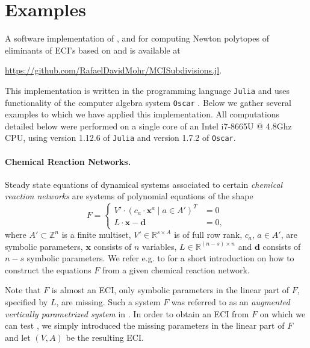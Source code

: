 \documentclass[a4paper]{article}
\theoremstyle{remark}
\def\RR{\mathbb{R}}
\def\ZZ{\mathbb{Z}}
\def\xx{\mathbf{x}}
\begin{document}
\section{Examples}
\label{sec:examples}

A software implementation of ,  and for
computing Newton polytopes of eliminants of ECI's based on
 and \cite{hugginsIB4eSoftwareFramework2006} is
available at
\begin{center}
  \url{https://github.com/RafaelDavidMohr/MCISubdivisions.jl}.
\end{center}
This implementation is written in the programming language
\texttt{Julia} \cite{bezanson2017} and uses functionality of the
computer algebra system \texttt{Oscar} \cite{OSCAR-book}. Below we
gather several examples to which we have applied this implementation.
All computations detailed below were performed on a single core of an
Intel i7-8665U @ 4.8Ghz CPU, using version 1.12.6 of \texttt{Julia}
and version 1.7.2 of \texttt{Oscar}.

\paragraph*{Chemical Reaction Networks.}

Steady state equations of dynamical systems associated to certain {\em
  chemical reaction networks} are systems of polynomial
equations of the shape
\[F =
  \begin{cases}
    V' \cdot (c_a \cdot \xx^a\;|\; a\in A')^T &= 0\\
    L \cdot \xx - \mathbf{d} &=0,
  \end{cases}
\]
where $A'\subset \ZZ^n$ is a finite multiset, $V'\in \RR^{s \times A}$ is of full row
rank, $c_a$, $a\in A'$, are symbolic parameters, $\xx$ consists of $n$
variables, $L\in \RR^{(n - s) \times n}$ and $\mathbf{d}$ consists of
$n-s$ symbolic parameters. We refer e.g. to
\cite{conradiIdentifyingParameterRegions2017} for a short introduction
on how to construct the equations $F$ from a given chemical reaction
network.

Note that $F$ is almost an ECI, only symbolic parameters in the linear
part of $F$, specified by $L$, are missing.  Such a system $F$ was
referred to as an {\em augmented vertically parametrized system} in
\cite{feliuRootBoundsVertical2026}. In order to obtain an ECI from $F$
on which we can test , we simply introduced the missing
parameters in the linear part of $F$ and let $(V, A)$ be the resulting
ECI.
\end{document}

